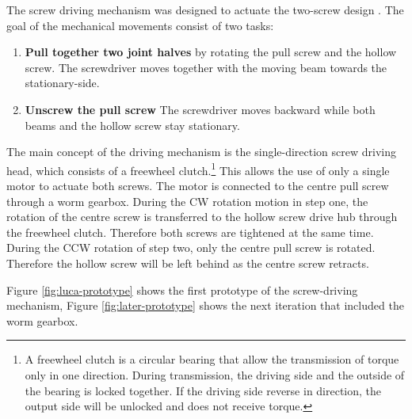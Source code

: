 The screw driving mechanism was designed to actuate the two-screw design . The goal of the mechanical movements consist of two tasks:

\begin{enumerate}
    \item \textbf{Pull together two joint halves} by rotating the pull screw and the hollow screw. The screwdriver moves together with the moving beam towards the stationary-side.
    \item \textbf{Unscrew the pull screw} The screwdriver moves backward while both beams and the hollow screw stay stationary.
\end{enumerate}

The main concept of the driving mechanism is the single-direction screw driving head, which consists of a freewheel clutch.\footnote{A freewheel clutch is a circular bearing that allow the transmission of torque only in one direction. During transmission, the driving side and the outside of the bearing is locked together. If the driving side reverse in direction, the output side will be unlocked and does not receive torque.} This allows the use of only a single motor to actuate both screws. The motor is connected to the centre pull screw through a worm gearbox. During the CW rotation motion in step one, the rotation of the centre screw is transferred to the hollow screw drive hub through the freewheel clutch. Therefore both screws are tightened at the same time. During the CCW rotation of step two, only the centre pull screw is rotated. Therefore the hollow screw will be left behind as the centre screw retracts.

Figure \ref{fig:luca-prototype} shows the first prototype of the screw-driving mechanism, Figure \ref{fig:later-prototype} shows the next iteration that included the worm gearbox. 

